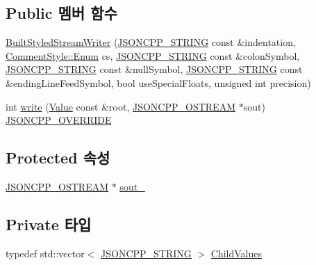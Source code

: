 \subsection*{Public 멤버 함수}
\begin{DoxyCompactItemize}
\item 
\hyperlink{struct_json_1_1_built_styled_stream_writer_adf11b7d1ee3c68d096b7c662ee85948e}{Built\+Styled\+Stream\+Writer} (\hyperlink{json_8h_a1e723f95759de062585bc4a8fd3fa4be}{J\+S\+O\+N\+C\+P\+P\+\_\+\+S\+T\+R\+I\+NG} const \&indentation, \hyperlink{struct_json_1_1_comment_style_a51fc08f3518fd81eba12f340d19a3d0c}{Comment\+Style\+::\+Enum} cs, \hyperlink{json_8h_a1e723f95759de062585bc4a8fd3fa4be}{J\+S\+O\+N\+C\+P\+P\+\_\+\+S\+T\+R\+I\+NG} const \&colon\+Symbol, \hyperlink{json_8h_a1e723f95759de062585bc4a8fd3fa4be}{J\+S\+O\+N\+C\+P\+P\+\_\+\+S\+T\+R\+I\+NG} const \&null\+Symbol, \hyperlink{json_8h_a1e723f95759de062585bc4a8fd3fa4be}{J\+S\+O\+N\+C\+P\+P\+\_\+\+S\+T\+R\+I\+NG} const \&ending\+Line\+Feed\+Symbol, bool use\+Special\+Floats, unsigned int precision)
\item 
int \hyperlink{struct_json_1_1_built_styled_stream_writer_a823cdb1afabb6b0d5f39bcd5a6a6f747}{write} (\hyperlink{class_json_1_1_value}{Value} const \&root, \hyperlink{json_8h_a37a25be5fca174927780caeb280094ce}{J\+S\+O\+N\+C\+P\+P\+\_\+\+O\+S\+T\+R\+E\+AM} $\ast$sout) \hyperlink{json_8h_a824d6199c91488107e443226fa6022c5}{J\+S\+O\+N\+C\+P\+P\+\_\+\+O\+V\+E\+R\+R\+I\+DE}
\end{DoxyCompactItemize}
\subsection*{Protected 속성}
\begin{DoxyCompactItemize}
\item 
\hyperlink{json_8h_a37a25be5fca174927780caeb280094ce}{J\+S\+O\+N\+C\+P\+P\+\_\+\+O\+S\+T\+R\+E\+AM} $\ast$ \hyperlink{class_json_1_1_stream_writer_a4f5603d4228a9fa46a42cb44e5234d9b}{sout\+\_\+}
\end{DoxyCompactItemize}
\subsection*{Private 타입}
\begin{DoxyCompactItemize}
\item 
typedef std\+::vector$<$ \hyperlink{json_8h_a1e723f95759de062585bc4a8fd3fa4be}{J\+S\+O\+N\+C\+P\+P\+\_\+\+S\+T\+R\+I\+NG} $>$ \hyperlink{struct_json_1_1_built_styled_stream_writer_a63196b38400e5ce452f65ce856d47b6f}{Child\+Values}
\end{DoxyCompactItemize}
